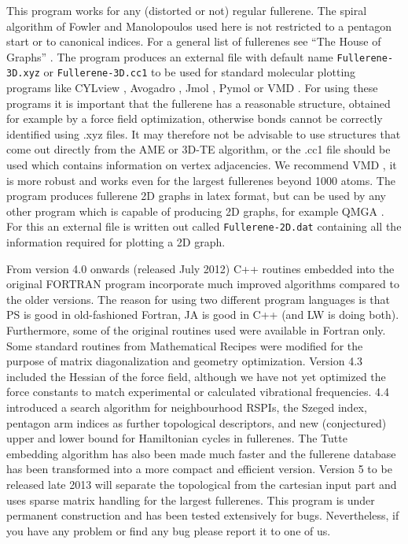 \documentclass[article,a4paper,twoside]{memoir}
\newcommand{\filename}[1]{\texttt{#1}}
\begin{document}
This program works for any (distorted or not) regular fullerene. The spiral algorithm of Fowler and Manolopoulos used here \cite{Atlas}
is not restricted to a pentagon start or to canonical indices. For a general list of fullerenes see ``The House of Graphs'' \cite{HouseofGraphs}. 
The program produces an external file with default name \filename{Fullerene-3D.xyz} or \filename{Fullerene-3D.cc1} to be used for standard molecular plotting programs
like CYLview \cite{CYLview}, Avogadro \cite{Avogadro}, Jmol \cite{JMol}, Pymol \cite{Pymol} or VMD \cite{vmd}.  For using these programs 
it is important that the fullerene has a reasonable structure, obtained for example by a force field 
optimization, otherwise bonds cannot be correctly identified using .xyz files. It may therefore not be advisable to use structures that come out directly from
the AME or 3D-TE algorithm, or the .cc1 file should be used which contains information on vertex adjacencies. 
We recommend VMD \cite{vmd}, it is more robust and works even for the largest fullerenes beyond 1000 atoms. The program produces fullerene 2D graphs 
in latex format, but can be used by any other program which is capable of producing 2D graphs, for example QMGA \cite{Gabriel2008}. 
For this an external file is written out called \filename{Fullerene-2D.dat} containing all the information required for plotting a 2D graph.

From version 4.0 onwards (released July 2012) C++ routines embedded into the original FORTRAN program incorporate
much improved algorithms compared to the older versions. The reason for using two different program languages is
that PS is good in old-fashioned Fortran, JA is good in C++ (and LW is doing both).  Furthermore, some of the original routines used were available 
in Fortran only. Some standard routines from Mathematical Recipes were modified for the purpose of matrix diagonalization 
and geometry optimization. Version 4.3 included the Hessian of the force field, although 
we have not yet optimized the force constants to match experimental or calculated vibrational frequencies.
4.4 introduced a search algorithm for neighbourhood RSPIs, the Szeged index, pentagon arm indices as further topological descriptors,
and new (conjectured) upper and lower bound for Hamiltonian cycles in fullerenes.
The Tutte embedding algorithm has also been made much faster and the fullerene database has been transformed into a more compact and efficient version.
Version 5 to be released late 2013 will separate the topological from the cartesian input part and uses sparse matrix handling for the
largest fullerenes. This program is under permanent construction and has been tested extensively for bugs.
Nevertheless, if you have any problem or find any bug please report it to one of us.
\end{document}
